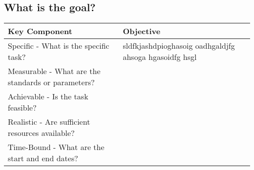 \documentclass{article}
\begin{document}
        \subsection{What is the goal?}
        
        \begin{tabular}{p{} | p{}}
            \textbf{Key Component} & \textbf{Objective} \\
            \hline
            Specific - What is the specific task? & sldfkjashdpioghasoig oadhgaldjfg ahsoga hgasoidfg hsgl \\
            Measurable - What are the standards or parameters? & \\
            Achievable - Is the task feasible? & \\
            Realistic - Are sufficient resources available? & \\
            Time-Bound - What are the start and end dates? & \\
        \end{tabular}

        
        
\end{document}
